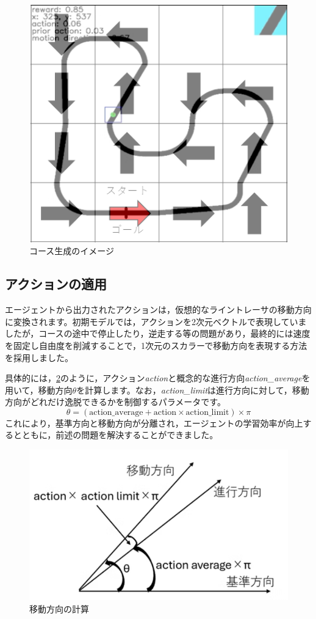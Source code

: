 \begin{figure}[h]
  \centering
  \includegraphics[width=0.7\hsize]{line-tracer/fig/image3.png}
  \caption{コース生成のイメージ}
  \label{fig:image3}
\end{figure}

\subsection{アクションの適用}
エージェントから出力されたアクションは，仮想的なライントレーサの移動方向に変換されます。初期モデルでは，アクションを2次元ベクトルで表現していましたが，コースの途中で停止したり，逆走する等の問題があり，最終的には速度を固定し自由度を削減することで，1次元のスカラーで移動方向を表現する方法を採用しました。

具体的には，\ref{fig:image4}のように，アクション\textit{action}と概念的な進行方向\textit{action\_average}を用いて，移動方向$\theta$を計算します。なお，\textit{action\_limit}は進行方向に対して，移動方向がどれだけ逸脱できるかを制御するパラメータです。
\[
\theta = (\text{action\_average} + \text{action} \times \text{action\_limit}) \times \pi
\]
これにより，基準方向と移動方向が分離され，エージェントの学習効率が向上するとともに，前述の問題を解決することができました。
\begin{figure}[h]
  \centering
  \includegraphics[width=0.7\hsize]{line-tracer/fig/image4.png}
  \caption{移動方向の計算}
  \label{fig:image4}
\end{figure}

